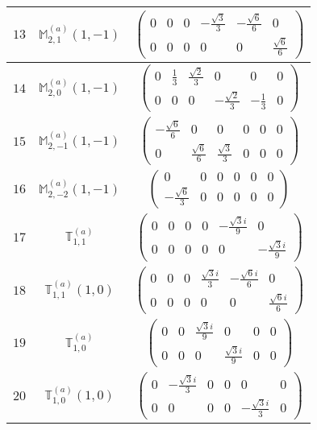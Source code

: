 \documentclass[fleqn,8pt,landscape]{jsarticle}
\begin{document}
\begin{center}
\begin{longtable}{ccc}
$ 13 $ & $ \mathbb{M}_{2,1}^{(a)}(1,-1) $ & $ \begin{pmatrix} 0 & 0 & 0 & - \frac{\sqrt{3}}{3} & - \frac{\sqrt{6}}{6} & 0 \\ 0 & 0 & 0 & 0 & 0 & \frac{\sqrt{6}}{6} \end{pmatrix} $ \\ \hline
$ 14 $ & $ \mathbb{M}_{2,0}^{(a)}(1,-1) $ & $ \begin{pmatrix} 0 & \frac{1}{3} & \frac{\sqrt{2}}{3} & 0 & 0 & 0 \\ 0 & 0 & 0 & - \frac{\sqrt{2}}{3} & - \frac{1}{3} & 0 \end{pmatrix} $ \\ \hline
$ 15 $ & $ \mathbb{M}_{2,-1}^{(a)}(1,-1) $ & $ \begin{pmatrix} - \frac{\sqrt{6}}{6} & 0 & 0 & 0 & 0 & 0 \\ 0 & \frac{\sqrt{6}}{6} & \frac{\sqrt{3}}{3} & 0 & 0 & 0 \end{pmatrix} $ \\ \hline
$ 16 $ & $ \mathbb{M}_{2,-2}^{(a)}(1,-1) $ & $ \begin{pmatrix} 0 & 0 & 0 & 0 & 0 & 0 \\ - \frac{\sqrt{6}}{3} & 0 & 0 & 0 & 0 & 0 \end{pmatrix} $ \\ \hline
$ 17 $ & $ \mathbb{T}_{1,1}^{(a)} $ & $ \begin{pmatrix} 0 & 0 & 0 & 0 & - \frac{\sqrt{3} i}{9} & 0 \\ 0 & 0 & 0 & 0 & 0 & - \frac{\sqrt{3} i}{9} \end{pmatrix} $ \\ \hline
$ 18 $ & $ \mathbb{T}_{1,1}^{(a)}(1,0) $ & $ \begin{pmatrix} 0 & 0 & 0 & \frac{\sqrt{3} i}{3} & - \frac{\sqrt{6} i}{6} & 0 \\ 0 & 0 & 0 & 0 & 0 & \frac{\sqrt{6} i}{6} \end{pmatrix} $ \\ \hline
$ 19 $ & $ \mathbb{T}_{1,0}^{(a)} $ & $ \begin{pmatrix} 0 & 0 & \frac{\sqrt{3} i}{9} & 0 & 0 & 0 \\ 0 & 0 & 0 & \frac{\sqrt{3} i}{9} & 0 & 0 \end{pmatrix} $ \\ \hline
$ 20 $ & $ \mathbb{T}_{1,0}^{(a)}(1,0) $ & $ \begin{pmatrix} 0 & - \frac{\sqrt{3} i}{3} & 0 & 0 & 0 & 0 \\ 0 & 0 & 0 & 0 & - \frac{\sqrt{3} i}{3} & 0 \end{pmatrix} $ \\ \hline

\end{longtable}
\end{center}
\end{document}
